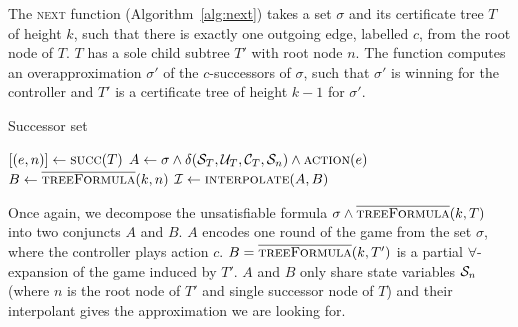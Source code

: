 The \textsc{next} function (Algorithm~\ref{alg:next}) takes a set $\sigma$ and its certificate tree $T$ of height $k$, such that there is exactly one outgoing edge, labelled $c$, from the root node of $T$.  $T$ has a sole child subtree $T'$ with root node $n$.  The function computes an overapproximation $\sigma'$ of the $c$-successors of $\sigma$, such that $\sigma'$ is winning for the controller and $T'$ is a certificate tree of height $k-1$ for $\sigma'$.

\begin{algorithm}
   \caption{Successor set}\label{alg:next}
   \begin{algorithmic}[1]
        \State $[(e, n)] \gets \Call{succ}{T}$ 
            \State $A \gets \sigma \land \delta(\cS_T, \cU_T, \cC_T, \cS_n) \land \Call{action}{e}$\label{alg:strat:partition:Ai}
            \State $B \gets \textsc{$\overline{\mbox{treeFormula}}$}(k, n) $\label{alg:strat:partition:Bi}
            \State $\mathcal{I} \gets \Call{interpolate}{A, B}$ \label{alg:strat:partition:I}
            \State {} \label{alg:strat:partition:return}
        \EndFunction
    \end{algorithmic}
\end{algorithm}

Once again, we decompose the unsatisfiable formula $\sigma \land \textsc{$\overline{\mbox{treeFormula}}$}(k, T)$ into two conjuncts $A$ and $B$.  $A$ encodes one round of the game from the set $\sigma$, where the controller plays action $c$.  $B = \textsc{$\overline{\mbox{treeFormula}}$}(k, T')$ is a partial $\forall$-expansion of the game induced by $T'$.  $A$ and $B$ only share state variables $\mathcal{S}_n$ (where $n$ is the root node of $T'$ and single successor node of $T$) and their interpolant gives the approximation we are looking for.

